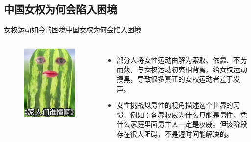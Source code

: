 \documentclass{beamer}
\begin{document}
	\subsection*{中国女权为何会陷入困境}
	\begin{frame}{女权运动如今的困境}{中国女权为何会陷入困境}
		\begin{columns}
			\begin{figure}
				\centering
				\includegraphics[width=\textwidth]{img/图片9.png}
			\end{figure}

			\begin{itemize}
				\item 部分人将女性运动曲解为索取、依靠、不劳而获，与女权运动初衷相背离，给女权运动摸黑，导致很多真正的女权运动者羞于发声。
				\item 女性挑战以男性的视角描述这个世界的习惯，例如：各界权威为什么只能是男性，凭什么家庭里面男主人一定是权威。但该阶段存在很大阻碍，不是短时间能解决的。
			\end{itemize}
		\end{columns}
	\end{frame}
\end{document}
